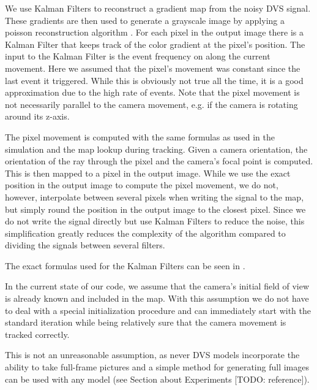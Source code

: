 We use Kalman Filters to reconstruct a gradient map from the noisy DVS signal.
These gradients are then used to generate a grayscale image by applying a
poisson reconstruction algorithm \cite{raskarpoisson}. For each pixel in the
output image there is a Kalman Filter that keeps track of the color gradient at
the pixel's position. The input to the Kalman Filter is the event frequency on
along the current movement. Here we assumed that the pixel's
movement was constant since the last event it triggered. While this is
obviously not true all the time, it is a good approximation due to the high
rate of events. Note that the pixel movement is not necessarily parallel to the
camera movement, e.g. if the camera is rotating around its z-axis.

The pixel movement is computed with the same formulas as used in the
simulation and the map lookup during tracking. Given a camera orientation, the
orientation of the ray through the pixel and the camera's focal point is
computed. This is then mapped to a pixel in the output image. While we use the
exact position in the output image to compute the pixel movement,  we do not,
however, interpolate between several pixels when writing the signal to the map,
but simply round the position in the output image to the closest pixel. Since
we do not write the signal directly but use Kalman Filters to reduce the noise,
this simplification greatly reduces the complexity of the algorithm compared to
dividing the signals between several filters.

The exact formulas used for the Kalman Filters can be seen in
\cite{kim2014simultaneous}.

In the current state of our code, we assume that the camera's initial field
of view is already known and included in the map. With this assumption we do
not have to deal with a special initialization procedure and can immediately
start with the standard iteration while being relatively sure that the camera
movement is tracked correctly.

This is not an unreasonable assumption, as never DVS models incorporate the
ability to take full-frame pictures and a simple method for generating full
images can be used with any model (see Section about Experiments [TODO:
reference]).
